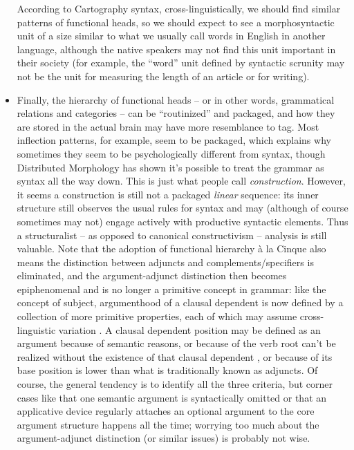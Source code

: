 \documentclass[a4paper, oneside]{report}
\newcommand*{\citechap}[1]{chap.~{#1}}
\newcommand*{\term}[1]{\emph{#1}}
\begin{document}
\begin{itemize}
        According to Cartography syntax, 
        cross-linguistically, 
        we should find similar patterns of functional heads,
        so we should expect to see a morphosyntactic unit 
        of a size similar to what we usually call words in English 
        in another language, 
        although the native speakers may not find this unit important in their society 
        (for example, the ``word'' unit defined by syntactic scrunity 
        may not be the unit for measuring the length of an article or for writing).
    \item Finally, the hierarchy of functional heads -- or in other words, 
        grammatical relations and categories -- 
        can be ``routinized'' and packaged,
        and how they are stored in the actual brain 
        may have more resemblance to \ac{tag}. 
        Most inflection patterns, for example, 
        seem to be packaged, 
        which explains why sometimes they seem to be psychologically different from syntax, 
        though Distributed Morphology has shown it's possible to treat the grammar 
        as syntax all the way down. 
        This is just what people call \term{construction}.
        However, it seems a construction is still not a packaged \emph{linear} sequence: 
        its inner structure still observes the usual rules for syntax 
        and may (although of course sometimes may not) engage 
        actively with productive syntactic elements. 
        Thus a structuralist -- as opposed to canonical constructivism -- 
        analysis is still valuable.
        Note that the adoption of functional hierarchy à la Cinque 
        also means the distinction between adjuncts and complements/specifiers 
        is eliminated, 
        and the argument-adjunct distinction then becomes epiphenomenal 
        and is no longer a primitive concept in grammar:
        like the concept of subject, 
        argumenthood of a clausal dependent 
        is now defined by a collection of more primitive properties, 
        each of which may assume cross-linguistic variation
        \citep{mcinnerney2022argument}.
        A clausal dependent position may be defined as an argument 
        because of semantic reasons,
        or because of the verb root can't be realized 
        without the existence of that clausal dependent
        \citep[\citechap{9}]{siddiqi2009syntax},
        or because of its base position is lower than what is traditionally 
        known as adjuncts.
        Of course, the general tendency is to identify all the three criteria,
        but corner cases like 
        that one semantic argument is syntactically omitted
        or that an applicative device regularly
        attaches an optional argument to the core argument structure
        happens all the time; 
        worrying too much about the argument-adjunct distinction 
        (or similar issues) is probably not wise.
\end{itemize}
\end{document}
